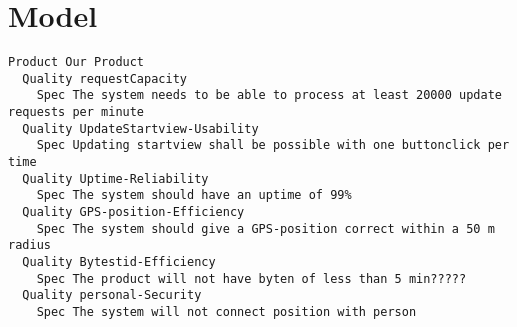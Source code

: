 \chapter{Model}


\begin{lstlisting}
Product Our Product
  Quality requestCapacity
    Spec The system needs to be able to process at least 20000 update requests per minute
  Quality UpdateStartview-Usability
    Spec Updating startview shall be possible with one buttonclick per time
  Quality Uptime-Reliability
    Spec The system should have an uptime of 99%
  Quality GPS-position-Efficiency
    Spec The system should give a GPS-position correct within a 50 m radius
  Quality Bytestid-Efficiency
    Spec The product will not have byten of less than 5 min?????
  Quality personal-Security
    Spec The system will not connect position with person

\end{lstlisting}